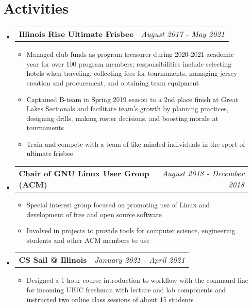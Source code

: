 \documentclass[letterpaper,11pt]{article}
\makeatletter
\newcommand{\resumeBullet}[1]
{\item[$\bullet$]\small
	{#1 \vspace{-1pt}
	}
}
\newcommand{\resumeSubheading}[2]
{\vspace{-1pt}\item[]\small
	\begin{tabular*}{0.97\textwidth}{l@{\extracolsep{\fill}}r}
		\textbf{#1} & \textit{\small #2} \\
	\end{tabular*}\vspace{-6pt}
}
\newcommand{\resumeSubHeadingListStart}{\begin{itemize}[leftmargin=*,itemsep=-0.2pt]}
\newcommand{\resumeSubHeadingListEnd}{\end{itemize}\vspace{-5pt}}
\newcommand{\resumeItemListStart}{\begin{itemize}[itemsep=0.2pt]}
\newcommand{\resumeItemListEnd}{\end{itemize}\vspace{-4pt}}
\makeatother
\begin{document}
\section{Activities}
  \resumeSubHeadingListStart
  \resumeSubheading
  {Illinois Rise Ultimate Frisbee}{August 2017 - May 2021}
  \resumeItemListStart
  	\resumeBullet
  	{Managed club funds as program treasurer during  2020-2021 academic year for over 100 program members; responsibilities include selecting hotels when traveling, collecting fees for
tournaments, managing jersey creation and procurement, and obtaining team equipment}
  	\resumeBullet
  	{Captained B-team in Spring 2019 season to a 2nd place finish at Great Lakes Sectionals and facilitate team's growth by planning practices, designing drills, making roster decisions, and boosting morale at tournaments}
  	\resumeBullet
  	{Train and compete with a team of like-minded individuals in the sport of ultimate frisbee}
  \resumeItemListEnd
  	\resumeSubheading
  	{Chair of GNU Linux User Group (ACM)}{August 2018 - December 2018}
  	\resumeItemListStart
  		\resumeBullet
  		{Special interest group focused on promoting use of Linux and development of free and open source software}
  		\resumeBullet
  		{Involved in projects to provide tools for computer science, engineering students and other ACM members to use}
  	\resumeItemListEnd
  	\resumeSubheading
  	{CS Sail @ Illinois}{January 2021 - April 2021}
	\resumeItemListStart
  		\resumeBullet
  		{Designed a 1 hour course introduction to workflow with the command line for incoming UIUC freshman with lecture and lab components and instructed two online class sessions of about 15 students}
  	\resumeItemListEnd
  \resumeSubHeadingListEnd
\end{document}
